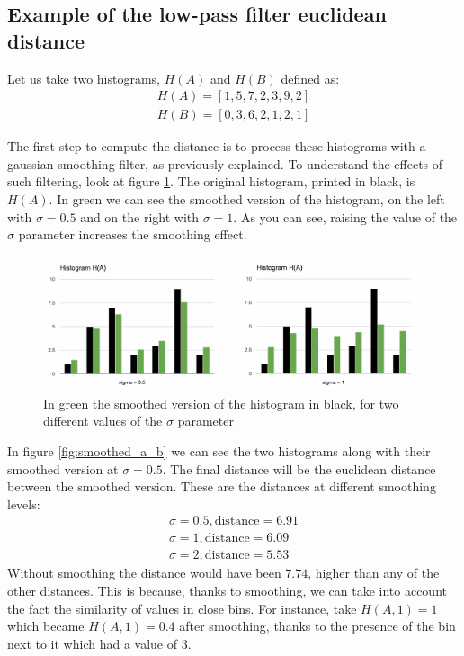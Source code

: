 \subsection{Example of the low-pass filter euclidean distance}

Let us take two histograms, $H(A)$ and $H(B)$ defined as:
\begin{align}
  H(A) = [1,5,7,2,3,9,2]\\
  H(B) = [0,3,6,2,1,2,1]
\end{align}

The first step to compute the distance is to process these histograms with a gaussian smoothing filter, as previously explained. To understand the effects of such filtering, look at figure \ref{fig:sigma_difference}. The original histogram, printed in black, is $H(A)$. In green we can see the smoothed version of the histogram, on the left with $\sigma = 0.5$ and on the right with $\sigma = 1$. As you can see, raising the value of the $\sigma$ parameter increases the smoothing effect.

\begin{figure}[h]
\centering
\includegraphics[width=450]{images/sigma_difference.pdf}
\caption{In green the smoothed version of the histogram in black, for two different values of the $\sigma$ parameter}
\label{fig:sigma_difference}
\end{figure}

In figure \ref{fig:smoothed_a_b} we can see the two histograms along with their smoothed version at $\sigma = 0.5$. The final distance will be the euclidean distance between the smoothed version. These are the distances at different smoothing levels:
\begin{align}
  \sigma = 0.5, \text{distance} = 6.91\nonumber\\
  \sigma = 1, \text{distance} = 6.09\nonumber\\
  \sigma = 2, \text{distance} = 5.53\nonumber
\end{align}
Without smoothing the distance would have been $7.74$, higher than any of the other distances. This is because, thanks to smoothing, we can take into account the fact the similarity of values in close bins. For instance, take $H(A,1) = 1$ which became $H(A,1) = 0.4$ after smoothing, thanks to the presence of the bin next to it which had a value of $3$.

